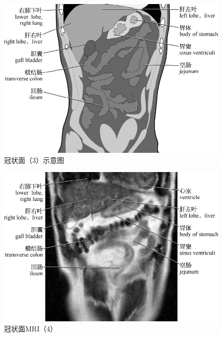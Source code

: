 \begin{figure}[!htbp]
 \centering
 \includegraphics{./images/Image00100.jpg}
 \captionsetup{justification=centering}
 \caption{冠状面（3）示意图}
  \end{figure} 
 \FloatBarrier

\begin{figure}[!htbp]
 \centering
 \includegraphics{./images/Image00101.jpg}
 \captionsetup{justification=centering}
 \caption{冠状面MRI（4）}
  \end{figure} 
 \FloatBarrier

